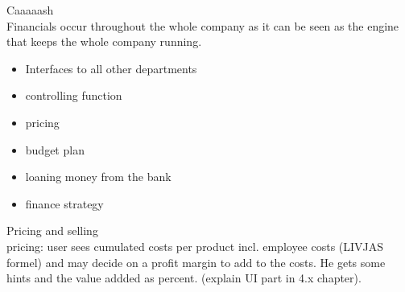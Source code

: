 \documentclass[11pt,titlepage,oneside,openany]{book}
\begin{document}
Caaaaash\\
Financials occur throughout the whole company as it can be seen as the engine that keeps the whole company running. 
\begin{itemize}
    \item Interfaces to all other departments
    \item controlling function
    \item pricing 
    \item budget plan
    \item loaning money from the bank
    \item finance strategy
\end{itemize}

Pricing and selling \\
pricing: user sees cumulated costs per product incl. employee costs (LIVJAS formel) and may decide on a profit margin to add to the costs. He gets some hints and the value addded as percent. (explain UI part in 4.x chapter).
\end{document}
